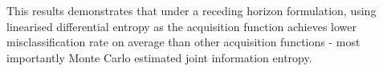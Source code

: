 \documentclass{article}
\begin{document}
		This results demonstrates that under a receding horizon formulation, using linearised differential entropy as the acquisition function achieves lower misclassification rate on average than other acquisition functions - most importantly Monte Carlo estimated joint information entropy.
			
%			
\end{document}
